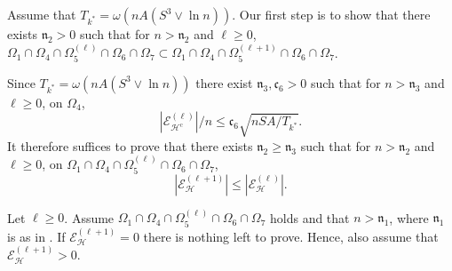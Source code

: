\documentclass[11pt]{article}
\newcommand{\mf}[1]{\mathfrak{#1}}
\newcommand{\mcE}{\mathcal{E}}
\newcommand{\mcH}{\mathcal{H}}
\theoremstyle{definition}
\theoremstyle{definition}
\begin{document}
Assume that $T_{k^*}=\omega(nA(S^3\vee \ln n))$.
Our first step is to show that there exists $\mf{n}_2>0$ such that for $n>\mf{n}_2$ and $\ell\geq 0$, $\Omega_1\cap\Omega_4\cap\Omega_5^{(\ell)}\cap\Omega_6\cap\Omega_7\subset \Omega_1\cap\Omega_4\cap\Omega_5^{(\ell+1)}\cap\Omega_6\cap\Omega_7$.

Since $T_{k^*} = \omega(nA(S^3\vee \ln n))$ there exist $\mf{n}_3,\mf{c}_6>0$ such that for $n>\mf{n}_3$ and $\ell\geq 0$, on $\Omega_4$,
\begin{equation}
	|\mcE^{(\ell)}_{\mcH^{\mathrm{c}}}|/n\leq \mf{c}_6\sqrt{nSA/T_{k^*}}
	.
\end{equation}
It therefore suffices to prove that there exists $\mf{n}_2\geq \mf{n}_3$ such that for $n>\mf{n}_2$ and $\ell\geq 0$, on $\Omega_1\cap\Omega_4\cap\Omega_5^{(\ell)}\cap\Omega_6\cap\Omega_7$,
\begin{equation}
	|\mcE^{(\ell+1)}_{\mcH}|\leq |\mcE^{(\ell)}_{\mcH}|
	.
\end{equation}

Let $\ell\geq 0$.
Assume $\Omega_1\cap\Omega_4\cap\Omega_5^{(\ell)}\cap\Omega_6\cap\Omega_7$ holds and that $n>\mf{n}_1$, where $\mf{n}_1$ is as in .
If $\mcE_{\mcH}^{(\ell+1)}=0$ there is nothing left to prove.
Hence, also assume that $\mcE_{\mcH}^{(\ell+1)}>0$.
\end{document}
